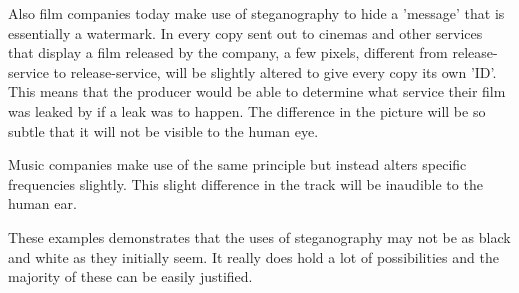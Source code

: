 Also film companies today make use of steganography to hide a 'message' that is essentially a watermark.
In every copy sent out to cinemas and other services that display a film released by the company, a few pixels, different from release-service to release-service, will be slightly altered to give every copy its own 'ID'.
This means that the producer would be able to determine what service their film was leaked by if a leak was to happen.
The difference in the picture will be so subtle that it will not be visible to the human eye.

Music companies make use of the same principle but instead alters specific frequencies slightly.
This slight difference in the track will be inaudible to the human ear. \cite{Anderson1998}

These examples demonstrates that the uses of steganography may not be as black and white as they initially seem.
It really does hold a lot of possibilities and the majority of these can be easily justified.

